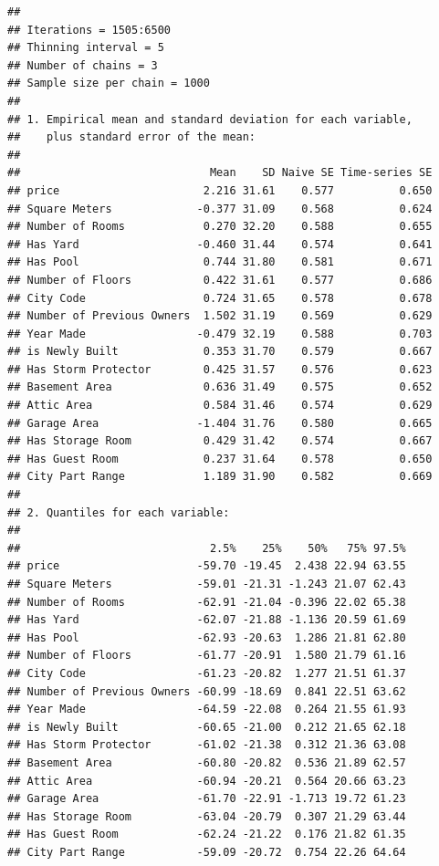 \documentclass[
]{article}
\begin{document}
\begin{verbatim}
## 
## Iterations = 1505:6500
## Thinning interval = 5 
## Number of chains = 3 
## Sample size per chain = 1000 
## 
## 1. Empirical mean and standard deviation for each variable,
##    plus standard error of the mean:
## 
##                             Mean    SD Naive SE Time-series SE
## price                      2.216 31.61    0.577          0.650
## Square Meters             -0.377 31.09    0.568          0.624
## Number of Rooms            0.270 32.20    0.588          0.655
## Has Yard                  -0.460 31.44    0.574          0.641
## Has Pool                   0.744 31.80    0.581          0.671
## Number of Floors           0.422 31.61    0.577          0.686
## City Code                  0.724 31.65    0.578          0.678
## Number of Previous Owners  1.502 31.19    0.569          0.629
## Year Made                 -0.479 32.19    0.588          0.703
## is Newly Built             0.353 31.70    0.579          0.667
## Has Storm Protector        0.425 31.57    0.576          0.623
## Basement Area              0.636 31.49    0.575          0.652
## Attic Area                 0.584 31.46    0.574          0.629
## Garage Area               -1.404 31.76    0.580          0.665
## Has Storage Room           0.429 31.42    0.574          0.667
## Has Guest Room             0.237 31.64    0.578          0.650
## City Part Range            1.189 31.90    0.582          0.669
## 
## 2. Quantiles for each variable:
## 
##                             2.5%    25%    50%   75% 97.5%
## price                     -59.70 -19.45  2.438 22.94 63.55
## Square Meters             -59.01 -21.31 -1.243 21.07 62.43
## Number of Rooms           -62.91 -21.04 -0.396 22.02 65.38
## Has Yard                  -62.07 -21.88 -1.136 20.59 61.69
## Has Pool                  -62.93 -20.63  1.286 21.81 62.80
## Number of Floors          -61.77 -20.91  1.580 21.79 61.16
## City Code                 -61.23 -20.82  1.277 21.51 61.37
## Number of Previous Owners -60.99 -18.69  0.841 22.51 63.62
## Year Made                 -64.59 -22.08  0.264 21.55 61.93
## is Newly Built            -60.65 -21.00  0.212 21.65 62.18
## Has Storm Protector       -61.02 -21.38  0.312 21.36 63.08
## Basement Area             -60.80 -20.82  0.536 21.89 62.57
## Attic Area                -60.94 -20.21  0.564 20.66 63.23
## Garage Area               -61.70 -22.91 -1.713 19.72 61.23
## Has Storage Room          -63.04 -20.79  0.307 21.29 63.44
## Has Guest Room            -62.24 -21.22  0.176 21.82 61.35
## City Part Range           -59.09 -20.72  0.754 22.26 64.64
\end{verbatim}
\end{document}
